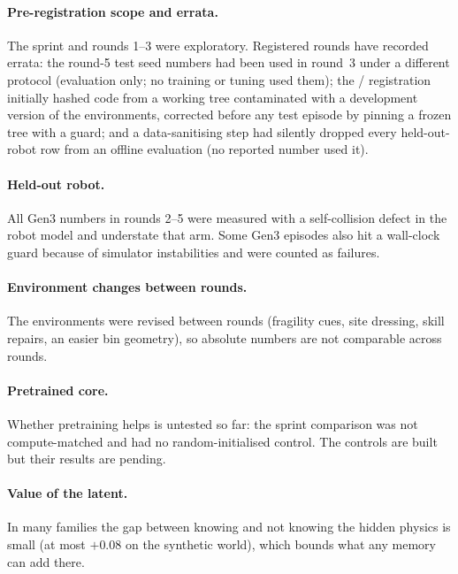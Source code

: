 \paragraph{Pre-registration scope and errata.} The sprint and rounds 1--3 were exploratory. Registered rounds
have recorded errata: the round-5 test seed numbers had been used in round~3 under a different protocol
(evaluation only; no training or tuning used them); the \sysI/\sysII{} registration initially hashed code from
a working tree contaminated with a development version of the environments, corrected before any test episode
by pinning a frozen tree with a guard; and a data-sanitising step had silently dropped every held-out-robot
row from an offline evaluation (no reported number used it).

\paragraph{Held-out robot.} All Gen3 numbers in rounds 2--5 were measured with a self-collision defect in the
robot model and understate that arm. Some Gen3 episodes also hit a wall-clock guard because of simulator
instabilities and were counted as failures.

\paragraph{Environment changes between rounds.} The environments were revised between rounds (fragility cues,
site dressing, skill repairs, an easier bin geometry), so absolute numbers are not comparable across rounds.

\paragraph{Pretrained core.} Whether pretraining helps is untested so far: the sprint comparison was not
compute-matched and had no random-initialised control. The controls are built but their results are pending.

\paragraph{Value of the latent.} In many families the gap between knowing and not knowing the hidden physics
is small (at most $+0.08$ on the synthetic world), which bounds what any memory can add there.
